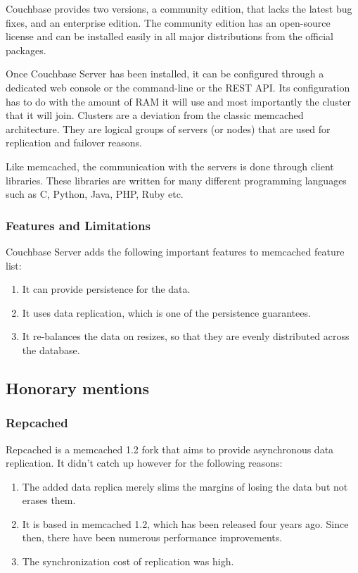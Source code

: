 Couchbase provides two versions, a community edition, that lacks the latest bug 
fixes, and an enterprise edition. The community edition has an open-source 
license and can be installed easily in all major distributions from the 
official packages.

Once Couchbase Server has been installed, it can be configured through a 
dedicated web console or the command-line or the REST API. Its configuration 
has to do with the amount of RAM it will use and most importantly the cluster 
that it will join. Clusters are a deviation from the classic memcached 
architecture. They are logical groups of servers (or nodes) that are used for 
replication and failover reasons.

Like memcached, the communication with the servers is done through client 
libraries. These libraries are written for many different programming languages 
such as C, Python, Java, PHP, Ruby etc.

\subsubsection{Features and Limitations}

Couchbase Server adds the following important features to memcached feature 
list:

\begin{enumerate}
	\item It can provide persistence for the data.
	\item It uses data replication, which is one of the persistence guarantees.  
	\item It re-balances the data on resizes, so that they are evenly 
		distributed across the database.
\end{enumerate}

\subsection{Honorary mentions}

\subsubsection{Repcached}

Repcached is a memcached 1.2 fork that aims to provide asynchronous data 
replication. It didn't catch up however for the following reasons:

\begin{enumerate}
	\item The added data replica merely slims the margins of losing the data 
		but not erases them.
	\item It is based in memcached 1.2, which has been released four years ago.  
		Since then, there have been numerous performance improvements.
	\item The synchronization cost of replication was high.
\end{enumerate}

